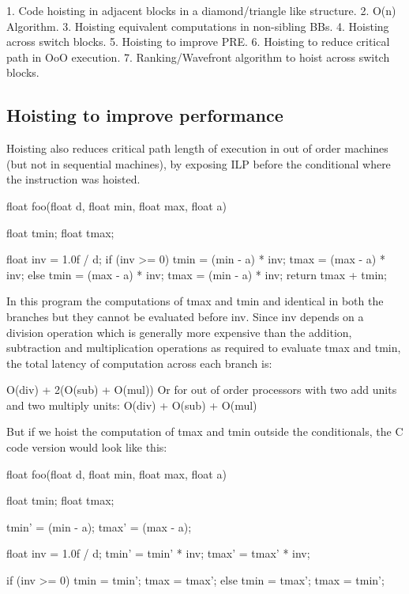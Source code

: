 \begin{section}

1. Code hoisting in adjacent blocks in a diamond/triangle like structure.
2. O(n) Algorithm.
3. Hoisting equivalent computations in non-sibling BBs.
4. Hoisting across switch blocks.
5. Hoisting to improve PRE.
6. Hoisting to reduce critical path in OoO execution.
7. Ranking/Wavefront algorithm to hoist across switch blocks.


\section{Hoisting to improve performance}
Hoisting also reduces critical path length of execution in out of order machines (but not in sequential machines), by exposing ILP before the conditional where the instruction was hoisted.

\begin{program}
float foo(float d, float min, float max, float a)
{
  float tmin;
  float tmax;

  float inv = 1.0f / d;
  if (inv >= 0) {
    tmin = (min - a) * inv;
    tmax = (max - a) * inv;
  } else {
    tmin = (max - a) * inv;
    tmax = (min - a) * inv;
  }
  return tmax + tmin;
}

\end{program}

In this program the computations of tmax and tmin and identical in both the branches but they cannot be evaluated before inv. Since inv depends on a division operation
which is generally more expensive than the addition, subtraction and multiplication operations as required to evaluate tmax and tmin, the total latency of computation across
each branch is:

O(div) + 2(O(sub) + O(mul))
Or for out of order processors with two add units and two multiply units:
O(div) + O(sub) + O(mul)

But if we hoist the computation of tmax and tmin outside the conditionals, the C code version would look like this:
\begin{program}
float foo(float d, float min, float max, float a)
{
  float tmin;
  float tmax;

  tmin' = (min - a);
  tmax' = (max - a);

  float inv = 1.0f / d;
  tmin' = tmin' * inv;
  tmax' = tmax' * inv;

  if (inv >= 0) {
    tmin = tmin';
    tmax = tmax';
  } else {
    tmin = tmax';
    tmax = tmin';
  }

}
\end{program}
\end{section}
